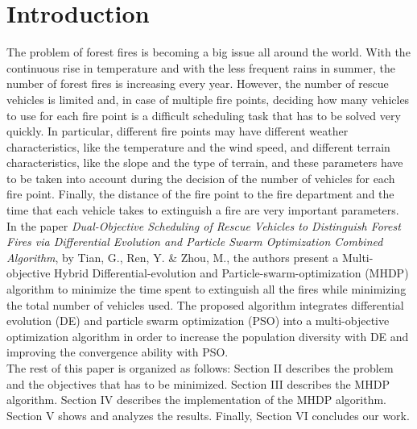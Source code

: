 \section{Introduction}
The problem of forest fires is becoming a big issue all around the world. With the continuous rise in temperature and with the less frequent rains in summer, the number of forest fires is increasing every year. However, the number of rescue vehicles is limited and, in case of multiple fire points, deciding how many vehicles to use for each fire point is a difficult scheduling task that has to be solved very quickly. In particular, different fire points may have different weather characteristics, like the temperature and the wind speed, and different terrain characteristics, like the slope and the type of terrain, and these parameters have to be taken into account during the decision of the number of vehicles for each fire point. Finally, the distance of the fire point to the fire department and the time that each vehicle takes to extinguish a fire are very important parameters.\\
In the paper \textit{Dual-Objective Scheduling of Rescue Vehicles to Distinguish Forest Fires via Differential Evolution and Particle Swarm Optimization Combined Algorithm}\cite{fire_distinguish}, by Tian, G., Ren, Y. \& Zhou, M., the authors present a  Multi-objective Hybrid Differential-evolution and Particle-swarm-optimization (MHDP) algorithm to minimize the time spent to extinguish all the fires while minimizing the total number of vehicles used. The proposed algorithm integrates differential evolution (DE) and particle swarm optimization (PSO) into a multi-objective optimization algorithm in order to increase the population diversity with DE and improving the convergence ability with PSO.
\\The rest of this paper is organized as follows: Section II
describes the problem and the objectives that has to be minimized. Section III describes the MHDP algorithm. 
Section IV describes the implementation of the MHDP algorithm. Section V shows and analyzes the results.
Finally, Section VI concludes our work.